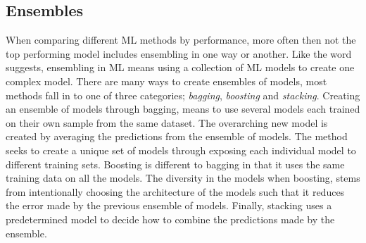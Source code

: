 \subsection{Ensembles}\label{subsec:Ensembles}
When comparing different \ac{ML} methods by performance, more often then not the top performing model includes 
ensembling in one way or another. Like the word suggests, ensembling in \ac{ML} means using a collection of 
\ac{ML} models to create one complex model. There are many ways to create ensembles of models, most methods 
fall in to one of three categories; \emph{bagging}, \emph{boosting} and \emph{stacking}. Creating an ensemble of models 
through bagging, means to use several models each trained on their own sample from the same dataset. The overarching 
new model is created by averaging the predictions from the ensemble of models. The method seeks to create a unique set of 
models through exposing each individual model to different training sets. Boosting is different to bagging in that it uses 
the same training data on all the models. The diversity in the models when boosting, stems from intentionally choosing the 
architecture of the models such that it reduces the error made by the previous ensemble of models. Finally, stacking uses 
a predetermined model to decide how to combine the predictions made by the ensemble. 
  
